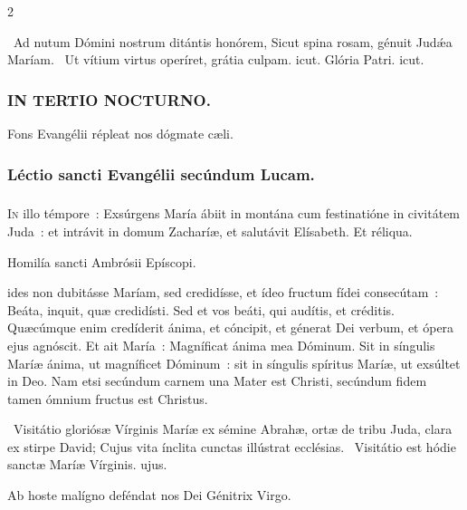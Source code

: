 \documentclass[9pt,twoside]{extarticle}
\begin{document}
\begin{multicols}{2}
{{\begin{tightlist}{}
\item {}~Ad nutum Dómini nostrum ditántis honórem, \textred{*} Sicut spina rosam, génuit Judǽa Maríam. ~Ut vítium virtus operíret, grátia culpam. icut. Glória Patri. icut.
\end{tightlist}

\subsubsection*{\center \textsc{IN TERTIO NOCTURNO.}}
\begin{tightlist}{}
\item {} Fons Evangélii répleat nos dógmate cæli.
\end{tightlist}

\subsubsection*{\center Léctio sancti Evangélii secúndum Lucam.}
\subsubsection*{\center {}}
\lettrine{I}n illo témpore~: Exsúrgens María ábiit in montána cum festinatióne in civitátem Juda~: et intrávit in domum Zacharíæ, et salutávit Elísabeth. Et réliqua.

\begin{center}Homilía sancti Ambrósii Epíscopi.\end{center}
ides non dubitásse Maríam, sed credidísse, et ídeo fructum fídei consecútam~: Beáta, inquit, quæ credidísti. Sed et vos beáti, qui audítis, et créditis. Quæcúmque enim credíderit ánima, et cóncipit, et génerat Dei verbum, et ópera ejus agnóscit. Et ait María~: Magníficat ánima mea Dóminum. Sit in síngulis Maríæ ánima, ut magníficet Dóminum~: sit in síngulis spíritus Maríæ, ut exsúltet in Deo. Nam etsi secúndum carnem una Mater est Christi, secúndum fidem tamen ómnium fructus est Christus.

\begin{tightlist}{}
\item {}~Visitátio gloriósæ Vírginis Maríæ ex sémine Abrahæ, ortæ de tribu Juda, clara ex stirpe David; \textred{*} Cujus vita ínclita cunctas illústrat ecclésias. ~Visitátio est hódie sanctæ Maríæ Vírginis. ujus.
\item {} Ab hoste malígno deféndat nos Dei Génitrix Virgo.
\end{tightlist}

}}
\end{multicols}
\end{document}
